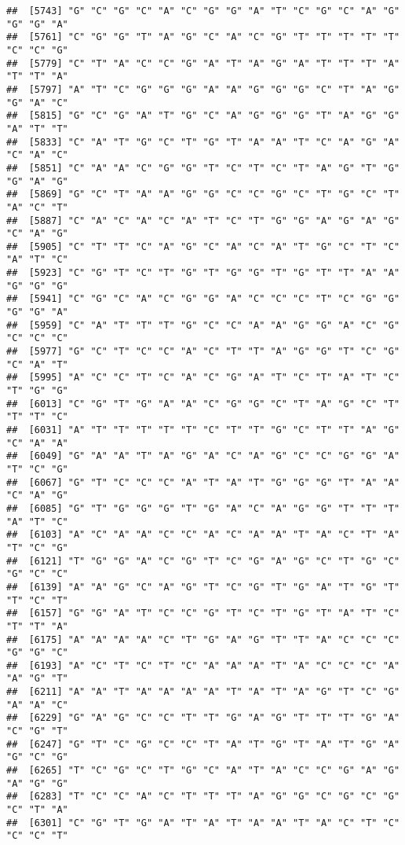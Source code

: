 \documentclass[
]{article}
\begin{document}
\begin{verbatim}
##  [5743] "G" "C" "G" "C" "A" "C" "G" "G" "A" "T" "C" "G" "C" "A" "G" "G" "G" "A"
##  [5761] "C" "G" "G" "T" "A" "G" "C" "A" "C" "G" "T" "T" "T" "T" "T" "C" "C" "G"
##  [5779] "C" "T" "A" "C" "C" "G" "A" "T" "A" "G" "A" "T" "T" "T" "A" "T" "T" "A"
##  [5797] "A" "T" "C" "G" "G" "G" "A" "A" "G" "G" "G" "C" "T" "A" "G" "G" "A" "C"
##  [5815] "G" "C" "G" "A" "T" "G" "C" "A" "G" "G" "G" "T" "A" "G" "G" "A" "T" "T"
##  [5833] "C" "A" "T" "G" "C" "T" "G" "T" "A" "A" "T" "C" "A" "G" "A" "C" "A" "C"
##  [5851] "C" "A" "A" "C" "G" "G" "T" "C" "T" "C" "T" "A" "G" "T" "G" "G" "A" "G"
##  [5869] "G" "C" "T" "A" "A" "G" "G" "C" "C" "G" "C" "T" "G" "C" "T" "A" "C" "T"
##  [5887] "C" "A" "C" "A" "C" "A" "T" "C" "T" "G" "G" "A" "G" "A" "G" "C" "A" "G"
##  [5905] "C" "T" "T" "C" "A" "G" "C" "A" "C" "A" "T" "G" "C" "T" "C" "A" "T" "C"
##  [5923] "C" "G" "T" "C" "T" "G" "T" "G" "G" "T" "G" "T" "T" "A" "A" "G" "G" "G"
##  [5941] "C" "G" "C" "A" "C" "G" "G" "A" "C" "C" "C" "T" "C" "G" "G" "G" "G" "A"
##  [5959] "C" "A" "T" "T" "T" "G" "C" "C" "A" "A" "G" "G" "A" "C" "G" "C" "C" "C"
##  [5977] "G" "C" "T" "C" "C" "A" "C" "T" "T" "A" "G" "G" "T" "C" "G" "C" "A" "T"
##  [5995] "A" "C" "C" "T" "C" "A" "C" "G" "A" "T" "C" "T" "A" "T" "C" "T" "G" "G"
##  [6013] "C" "G" "T" "G" "A" "A" "C" "G" "G" "C" "T" "A" "G" "C" "T" "T" "T" "C"
##  [6031] "A" "T" "T" "T" "T" "T" "C" "T" "T" "G" "C" "T" "T" "A" "G" "C" "A" "A"
##  [6049] "G" "A" "A" "T" "A" "G" "A" "C" "A" "G" "C" "C" "G" "G" "A" "T" "C" "G"
##  [6067] "G" "T" "C" "C" "C" "A" "T" "A" "T" "G" "G" "G" "T" "A" "A" "C" "A" "G"
##  [6085] "G" "T" "G" "G" "G" "T" "G" "A" "C" "A" "G" "G" "T" "T" "T" "A" "T" "C"
##  [6103] "A" "C" "A" "A" "C" "C" "A" "C" "A" "A" "T" "A" "C" "T" "A" "T" "C" "G"
##  [6121] "T" "G" "G" "A" "C" "G" "T" "C" "G" "A" "G" "C" "T" "G" "C" "G" "C" "C"
##  [6139] "A" "A" "G" "C" "A" "G" "T" "C" "G" "T" "G" "A" "T" "G" "T" "T" "C" "T"
##  [6157] "G" "G" "A" "T" "C" "C" "G" "T" "C" "T" "G" "T" "A" "T" "C" "T" "T" "A"
##  [6175] "A" "A" "A" "A" "C" "T" "G" "A" "G" "T" "T" "A" "C" "C" "C" "G" "G" "C"
##  [6193] "A" "C" "T" "C" "T" "C" "A" "A" "A" "T" "A" "C" "C" "C" "A" "A" "G" "T"
##  [6211] "A" "A" "T" "A" "A" "A" "A" "T" "A" "T" "A" "G" "T" "C" "G" "A" "A" "C"
##  [6229] "G" "A" "G" "C" "C" "T" "T" "G" "A" "G" "T" "T" "T" "G" "A" "C" "G" "T"
##  [6247] "G" "T" "C" "G" "C" "C" "T" "A" "T" "G" "T" "A" "T" "G" "A" "G" "C" "G"
##  [6265] "T" "C" "G" "C" "T" "G" "C" "A" "T" "A" "C" "C" "G" "A" "G" "A" "G" "G"
##  [6283] "T" "C" "C" "A" "C" "T" "T" "T" "A" "G" "G" "C" "G" "C" "G" "C" "T" "A"
##  [6301] "C" "G" "T" "G" "A" "T" "A" "T" "A" "A" "T" "A" "C" "T" "C" "C" "C" "T"

\end{verbatim}
\end{document}
